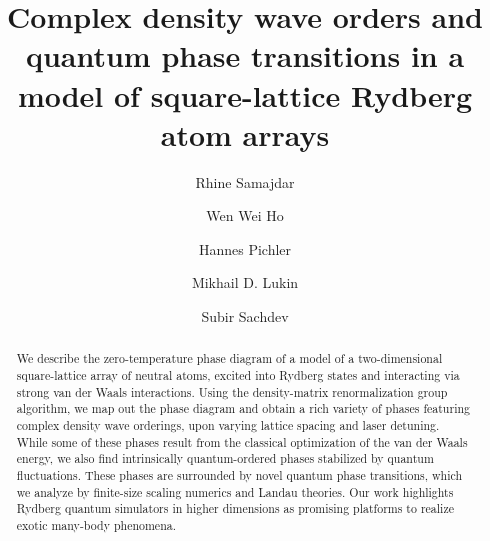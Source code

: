\documentclass[prl,twocolumn,superscriptaddress,showpacs,amsmath,amstex,amssymb,citeautoscript]{revtex4-1}
\begin{document}
\title{Complex density wave orders and quantum phase transitions in a model of square-lattice Rydberg atom arrays}
\author{Rhine Samajdar}
\author{Wen Wei Ho}
\author{Hannes Pichler}
\author{Mikhail D. Lukin}
\author{Subir Sachdev}


\begin{abstract}
We describe the zero-temperature phase diagram of a model of a two-dimensional square-lattice array of neutral atoms, excited into Rydberg states and 
interacting via strong van der Waals interactions. Using the density-matrix renormalization group algorithm, we map out the phase diagram and obtain a rich variety of phases featuring complex density wave orderings, upon varying lattice spacing and laser detuning.
%
While some of these phases result from the classical optimization of the van der Waals energy, 
we also find intrinsically quantum-ordered phases stabilized by quantum fluctuations. These phases are surrounded 
by novel quantum phase transitions, 
which we analyze by finite-size scaling numerics and Landau theories.
%
Our work highlights Rydberg quantum simulators in higher dimensions as promising platforms to realize exotic many-body phenomena. 

\end{abstract}
\maketitle


\hypersetup{linkcolor=blue}
\end{document}

